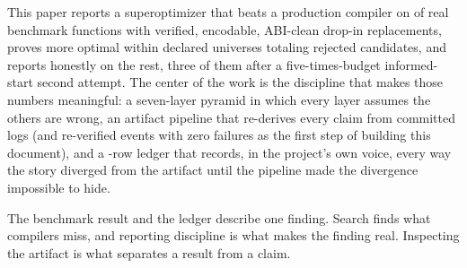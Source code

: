 \documentclass[journal,10pt]{IEEEtran}
\begin{document}
This paper reports a superoptimizer that beats a production compiler
on \NumBeaten{} of \NumFunctions{} real benchmark functions with
verified, encodable, ABI-clean drop-in replacements, proves
\NumMatched{} more optimal within declared universes totaling
\TotalCandidates{} rejected candidates, and reports honestly on the
rest, three of them after a five-times-budget informed-start second
attempt. The center of the work is the discipline that makes those
numbers meaningful: a seven-layer pyramid in which every layer assumes
the others are wrong, an artifact pipeline that re-derives every claim
from committed logs (and re-verified \RecheckTotal{} events with zero
failures as the first step of building this document), and a
\NumLedgerRows{}-row ledger that records, in the project's own voice,
every way the story diverged from the artifact until the pipeline made
the divergence impossible to hide.

The benchmark result and the ledger describe one finding. Search finds
what compilers miss, and reporting discipline is what makes the
finding real. Inspecting the artifact is what separates a result from
a claim.
\end{document}
